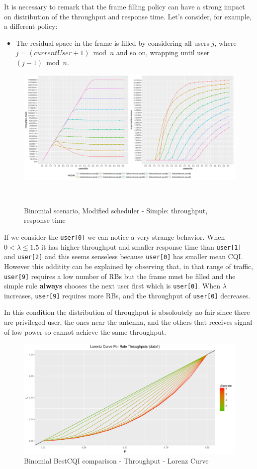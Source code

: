 It is necessary to remark that the frame filling policy can have a strong impact on distribution of the throughput and response time. Let's consider, for example, a different policy: 
\begin{itemize}
\item The residual space in the frame is filled by considering all users \(j\), where \(j = (currentUser+1) \bmod n\) and so on, wrapping until user \((j-1) \bmod n\).
\end{itemize}
\begin{figure}[H]
  \includegraphics[width=1\textwidth]{images/binom_old}
  \caption{Binomial scenario, Modified scheduler - Simple: throughput, response time}\
  \label{fig:Binomial scenario - Simple: throughput, response time}
\end{figure}
If we consider the \texttt{user[0]} we can notice a very strange behavior. When \(0 < \lambda \leq 1.5\) it has higher throughput and smaller response time than \texttt{user[1]} and \texttt{user[2]} and this seems senseless because \texttt{user[0]} has smaller mean CQI. However this odditity can be explained by observing that, in that range of traffic, \texttt{user[9]} requires a low number of RBs but the frame must be filled and the simple rule \textbf{always} chooses the next user first which is \texttt{user[0]}. When \(\lambda\) increases, \texttt{user[9]} requires more RBs, and the throughput of \texttt{user[0]} decreases.

In this condition the distribution of throughput is absoloutely no fair since there are privileged user, the ones near the antenna, and the others that receives signal of low power so cannot achieve the same throughput.
\begin{figure}[H]
  \includegraphics[width=1\textwidth]{images/lorallth-binombest.png}
  \caption{Binomial BestCQI comparison - Throughput - Lorenz Curve}
  \label{fig:lorallth-binombest}
\end{figure}

